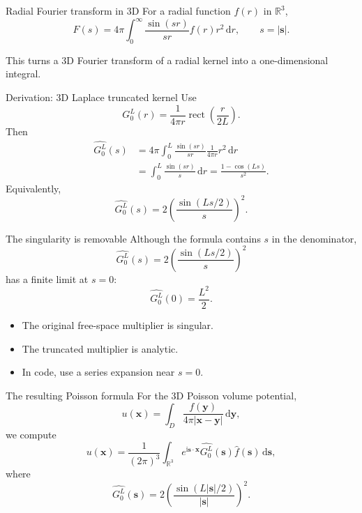 \documentclass[aspectratio=169,11pt]{beamer}
\newcommand{\R}{\mathbb{R}}
\newcommand{\dd}{\,\mathrm d}
\newcommand{\ii}{\mathrm i}
\newcommand{\x}{\bm{x}}
\newcommand{\y}{\bm{y}}
\newcommand{\s}{\bm{s}}
\DeclareMathOperator{\rect}{rect}
\begin{document}
\begin{frame}{Radial Fourier transform in 3D}
\small
For a radial function $f(r)$ in $\R^3$,
\[
  F(s)=4\pi\int_0^\infty
  \frac{\sin(sr)}{sr}f(r)r^2\dd r,
  \qquad s=|\s|.
\]

\vspace{2mm}
This turns a 3D Fourier transform of a radial kernel into a one-dimensional integral.
\end{frame}

\begin{frame}{Derivation: 3D Laplace truncated kernel}
\small
Use
\[
  G_0^L(r)=\frac{1}{4\pi r}\rect\left(\frac{r}{2L}\right).
\]
Then
\[
\begin{aligned}
  \widehat{G_0^L}(s)
  &=4\pi\int_0^L
  \frac{\sin(sr)}{sr}\frac{1}{4\pi r}r^2\dd r \\
  &=\int_0^L\frac{\sin(sr)}{s}\dd r
  =\frac{1-\cos(Ls)}{s^2}.
\end{aligned}
\]
Equivalently,
\[
  \widehat{G_0^L}(s)=2\left(\frac{\sin(Ls/2)}{s}\right)^2.
\]
\end{frame}

\begin{frame}{The singularity is removable}
\small
Although the formula contains $s$ in the denominator,
\[
  \widehat{G_0^L}(s)=2\left(\frac{\sin(Ls/2)}{s}\right)^2
\]
has a finite limit at $s=0$:
\[
  \widehat{G_0^L}(0)=\frac{L^2}{2}.
\]

\begin{itemize}
  \item The original free-space multiplier is singular.
  \item The truncated multiplier is analytic.
  \item In code, use a series expansion near $s=0$.
\end{itemize}
\end{frame}

\begin{frame}{The resulting Poisson formula}
\small
For the 3D Poisson volume potential,
\[
  u(\x)=\int_D\frac{f(\y)}{4\pi|\x-\y|}\dd\y,
\]
we compute
\[
  u(\x)=
  \frac{1}{(2\pi)^3}
  \int_{\R^3}
  e^{\ii\s\cdot\x}
  \widehat{G_0^L}(\s)\widehat{f}(\s)\dd\s,
\]
where
\[
  \widehat{G_0^L}(\s)=2\left(\frac{\sin(L|\s|/2)}{|\s|}\right)^2.
\]
\end{frame}
\end{document}
